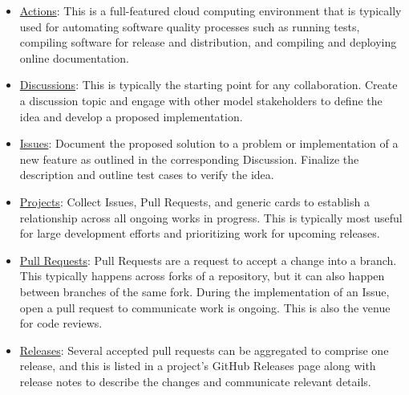 \documentclass[]{nlr}
\begin{document}
\begin{itemize}
\item \href{https://github.com/features/actions}{Actions}: This is a full-featured cloud computing
environment that is typically used for automating software quality processes such as
running tests, compiling software for release and distribution, and compiling and deploying
online documentation.

\item \href{https://docs.github.com/en/discussions}{Discussions}: This is typically the starting point
for any collaboration. Create a discussion topic and engage with other model stakeholders
to define the idea and develop a proposed implementation.

\item \href{https://docs.github.com/en/issues/tracking-your-work-with-issues/about-issues}{Issues}:
Document the proposed solution to a problem or implementation of a new feature as outlined
in the corresponding Discussion. Finalize the description and outline test cases to verify
the idea.

\item \href{https://docs.github.com/en/issues/planning-and-tracking-with-projects/learning-about-projects/about-projects}{Projects}:
Collect Issues, Pull Requests, and generic cards to establish a relationship across all
ongoing works in progress. This is typically most useful for large development efforts
and prioritizing work for upcoming releases.

\item \href{https://docs.github.com/en/pull-requests/collaborating-with-pull-requests/proposing-changes-to-your-work-with-pull-requests/about-pull-requests}{Pull Requests}:
Pull Requests are a request to accept a change into a branch. This typically happens
across forks of a repository, but it can also happen between branches of the same fork.
During the implementation of an Issue, open a pull request to communicate work is
ongoing. This is also the venue for code reviews.

\item \href{https://docs.github.com/en/repositories/releasing-projects-on-github/about-releases}{Releases}:
Several accepted pull requests can be aggregated to comprise one release, and this is
listed in a project’s GitHub Releases page along with release notes to describe the changes
and communicate relevant details.

\end{itemize}
\end{document}
